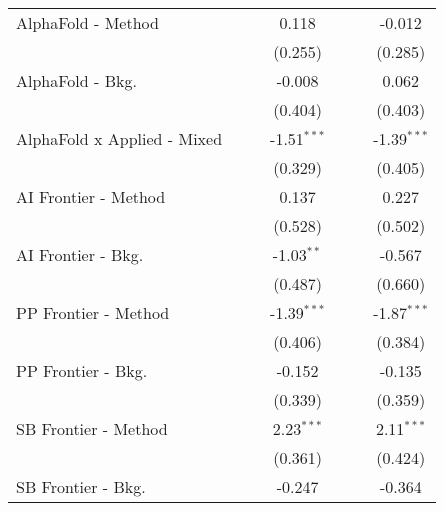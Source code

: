 \begin{tabular}{lcccccc}
   AlphaFold - Method             &         &             & 0.118         &              &             & -0.012\\   
                                  &         &             & (0.255)       &              &             & (0.285)\\   
   AlphaFold - Bkg.               &         &             & -0.008        &              &             & 0.062\\   
                                  &         &             & (0.404)       &              &             & (0.403)\\   
   AlphaFold x Applied - Mixed    &         &             & -1.51$^{***}$ &              &             & -1.39$^{***}$\\   
                                  &         &             & (0.329)       &              &             & (0.405)\\   
   AI Frontier - Method           &         &             & 0.137         &              &             & 0.227\\   
                                  &         &             & (0.528)       &              &             & (0.502)\\   
   AI Frontier - Bkg.             &         &             & -1.03$^{**}$  &              &             & -0.567\\   
                                  &         &             & (0.487)       &              &             & (0.660)\\   
   PP Frontier - Method           &         &             & -1.39$^{***}$ &              &             & -1.87$^{***}$\\   
                                  &         &             & (0.406)       &              &             & (0.384)\\   
   PP Frontier - Bkg.             &         &             & -0.152        &              &             & -0.135\\   
                                  &         &             & (0.339)       &              &             & (0.359)\\   
   SB Frontier - Method           &         &             & 2.23$^{***}$  &              &             & 2.11$^{***}$\\   
                                  &         &             & (0.361)       &              &             & (0.424)\\   
   SB Frontier - Bkg.             &         &             & -0.247        &              &             & -0.364\\   

\end{tabular}
